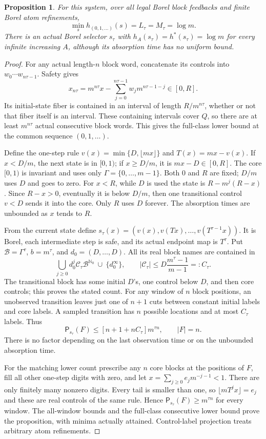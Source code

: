 \documentclass[11pt,reqno]{amsart}
\numberwithin{equation}{section}
\newtheorem{proposition}[theorem]{Proposition}
\theoremstyle{definition}
\newcommand{\Nzero}{\mathbb N_0}
\newcommand{\Patt}{\mathsf P}
\begin{document}
\begin{proposition}\label{prop:integer}
For this system, over all legal Borel block feedbacks and finite
Borel atom refinements,
\[
 \min_s h_{(0,1,\ldots)}(s)=L_\tau=M_\tau=\log m.
\]
There is an actual Borel selector $s_\tau$ with
$h_A(s_\tau)=h^*(s_\tau)=\log m$ for every infinite increasing
$A$, although its absorption time has no uniform bound.
\end{proposition}
\begin{proof}
For any actual length-$n$ block word, concatenate its controls into
$w_0\cdots w_{n\tau-1}$. Safety gives
\[
 x_{n\tau}=m^{n\tau}x-\sum_{j=0}^{n\tau-1}
                   w_jm^{n\tau-1-j}\in[0,R].
\]
Its initial-state fiber is contained in an interval of length
$R/m^{n\tau}$, whether or not that fiber itself is an interval.
These containing intervals cover $Q$, so there are at least
$m^{n\tau}$ actual consecutive block words. This gives the
full-class lower bound at the common sequence $(0,1,\ldots)$.

Define the one-step rule $v(x)=\min\{D,\lfloor mx\rfloor\}$
and $T(x)=mx-v(x)$. If $x<D/m$, the next state is in $[0,1)$;
if $x\ge D/m$, it is $mx-D\in[0,R]$.
The core $[0,1)$ is invariant and uses only
$\Gamma=\{0,\ldots,m-1\}$. Both $0$ and $R$ are fixed;
$D/m$ uses $D$ and goes to zero.
For $x<R$, while $D$ is used the state is
$R-m^j(R-x)$. Since $R-x>0$, eventually it is below $D/m$,
then one transitional control $v<D$ sends it into the core.
Only $R$ uses $D$ forever. The absorption times are unbounded
as $x$ tends to $R$.

From the current state define
$s_\tau(x)=(v(x),v(Tx),\ldots,v(T^{\tau-1}x))$.
It is Borel, each intermediate step is safe, and its actual endpoint
map is $T^\tau$. Put $\mathcal B=\Gamma^\tau$,
$b=m^\tau$, and $d_0=(D,\ldots,D)$.
All its real block names are contained in
\[
 \bigcup_{j\ge0}d_0^j\mathcal C_\tau\mathcal B^{\Nzero}
 \ \cup\ \{d_0^\infty\},\qquad
 |\mathcal C_\tau|\le D\frac{m^\tau-1}{m-1}=:C_\tau.
\]
The transitional block has some initial $D$'s, one control below
$D$, and then core controls; this proves the stated count.
For any window of $n$ block positions, an unobserved transition
leaves just one of $n+1$ cuts between constant initial labels and
core labels. A sampled transition has $n$ possible locations and
at most $C_\tau$ labels. Thus
\[
 \Patt_{s_\tau}(F)\le[n+1+nC_\tau]m^{\tau n},\qquad |F|=n.
\]
There is no factor depending on the last observation time or on
the unbounded absorption time.

For the matching lower count prescribe any $n$ core blocks at the
positions of $F$, fill all other one-step digits with zero, and let
$x=\sum_{j\ge0}e_jm^{-j-1}<1$. There are only finitely many
nonzero digits. Every tail is smaller than one, so
$\lfloor mT^jx\rfloor=e_j$ and these are real controls of the
same rule. Hence $\Patt_{s_\tau}(F)\ge m^{\tau n}$ for every
window. The all-window bounds and the full-class consecutive lower
bound prove the proposition, with minima actually attained.
Control-label projection treats arbitrary atom refinements.
\end{proof}
\end{document}
